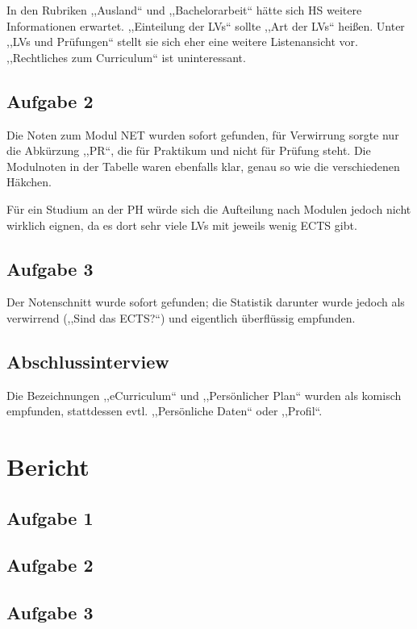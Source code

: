 \documentclass[a4paper,10pt]{scrartcl}
\begin{document}
In den Rubriken ,,Ausland`` und ,,Bachelorarbeit`` hätte sich HS weitere Informationen erwartet. ,,Einteilung der LVs`` sollte ,,Art der LVs`` heißen. Unter ,,LVs und Prüfungen`` stellt sie sich eher eine weitere Listenansicht vor. ,,Rechtliches zum Curriculum`` ist uninteressant.

\subsection*{Aufgabe 2}

Die Noten zum Modul NET wurden sofort gefunden, für Verwirrung sorgte nur die Abkürzung ,,PR``, die für Praktikum und nicht für Prüfung steht. Die Modulnoten in der Tabelle waren ebenfalls klar, genau so wie die verschiedenen Häkchen.

Für ein Studium an der PH würde sich die Aufteilung nach Modulen jedoch nicht wirklich eignen, da es dort sehr viele LVs mit jeweils wenig ECTS gibt.

\subsection*{Aufgabe 3}

Der Notenschnitt wurde sofort gefunden; die Statistik darunter wurde jedoch als verwirrend (,,Sind das ECTS?“) und eigentlich überflüssig empfunden.

\subsection*{Abschlussinterview}

Die Bezeichnungen ,,eCurriculum`` und ,,Persönlicher Plan`` wurden als komisch empfunden, stattdessen evtl. ,,Persönliche Daten`` oder ,,Profil``.

\section{Bericht}

\subsection{Aufgabe 1}

\subsection{Aufgabe 2}

\subsection{Aufgabe 3}
\end{document}
